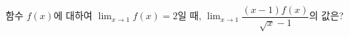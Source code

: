 함수 $f(x)$에 대하여 $\displaystyle\lim_{x\to 1} f(x)=2$일 때, $\displaystyle\lim_{x\to 1}\dfrac{(x-1)f(x)}{\sqrt{x}-1}$의 값은?
